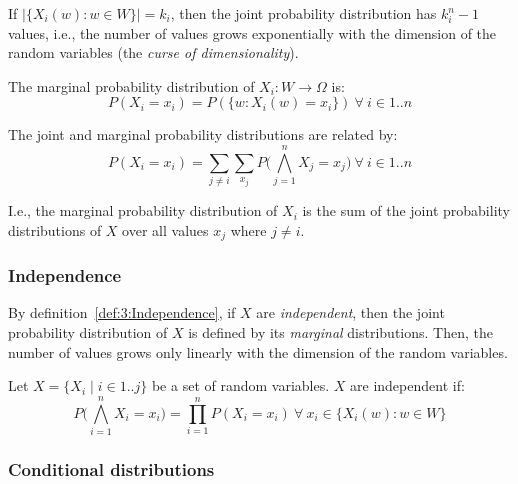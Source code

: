 If $|\{ X_i(w) : w \in W \}| = k_i$, then the joint probability distribution
has $k_i^n - 1$ values, i.e., the number of values grows exponentially with the
dimension of the random variables (the \textit{curse of dimensionality}).

\begin{dfn}
  The marginal probability distribution of $X_i : W \rightarrow \Omega$ is:
  \begin{equation}
    P(X_i = x_i) = P(\{ w : X_i(w) = x_i \})
    \ \forall\
    i \in 1 .. n
  \end{equation}
\end{dfn}

\begin{thm}
  The joint and marginal probability distributions are related by:
  \begin{equation}
    P(X_i = x_i) =
    \sum_{j \neq i}
    \sum_{x_j}
    P \bigl( \bigwedge_{j = 1}^{n} X_j = x_j \bigr)
    \ \forall\ i \in 1 .. n
  \end{equation}
\end{thm}

I.e., the marginal probability distribution of $X_i$ is the sum of the joint
probability distributions of $X$ over all values $x_j$ where $j \neq i$.

\subsubsection{Independence}

By definition~\ref{def:3:Independence}, if $X$ are \textit{independent}, then
the joint probability distribution of $X$ is defined by its \textit{marginal}
distributions.
Then, the number of values grows only linearly with the dimension of the random
variables.

\begin{dfn}
  [Independence]
  \label{def:3:Independence}
  Let $X = \{ X_i \mid i \in 1 .. j \}$ be a set of random variables.
  $X$ are independent if:
  \begin{equation}
    P \bigl( \bigwedge_{i = 1}^{n} X_i = x_i \bigr)
    = \prod_{i = 1}^{n} P(X_i = x_i)
    \ \forall \
    x_i \in \{ X_i(w) : w \in W \}
  \end{equation}
\end{dfn}

\subsubsection{Conditional distributions}

